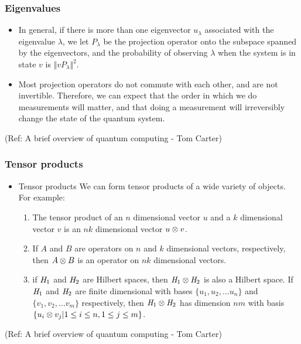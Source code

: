  \begin{frame}[fragile]\frametitle{Eigenvalues}

\begin{itemize}
	\item In general, if there is more than one eigenvector $u_\lambda$ associated with the
		eigenvalue $\lambda$, we let $P_\lambda$ be the projection operator onto the subspace
		spanned by the eigenvectors, and the probability of observing $\lambda$ when the
		system is in state $v$ is $\Vert v P_\lambda \Vert ^ 2 $.
		
	\item Most projection operators do not commute with each other, and are not invertible.
	  	Therefore, we can expect that the order in which we do measurements will matter, and that
	   	doing a measurement will irreversibly change the state of the quantum system.

\end{itemize}

\tiny{(Ref: A brief overview of quantum computing - Tom Carter)}

\end{frame}

 \begin{frame}[fragile]\frametitle{Tensor products}

\begin{itemize}
	\item Tensor products \newline
	We can form tensor products of a wide variety of objects.  For example: 
	\begin{enumerate}
		\item The tensor product of an $n$ dimensional vector $u$ and a $k$ dimensional vector $v$ is 				an $nk$ dimensional vector $u \otimes v$.
		\item If $A$ and $B$ are operators on $n$ and $k$ dimensional vectors, respectively, then $A \otimes B$ is an operator on $nk$ dimensional vectors.
		\item if $\mathit{H}_1$ and $\mathit{H}_2$ are Hilbert spaces, then $\mathit{H}_1 \otimes \mathit{H}_2$ is also a Hilbert space.  If $\mathit{H}_1$ and $\mathit{H}_2$ are finite dimensional with bases $\{u_1, u_2, \ldots u_n\}$ and $\{v_1, v_2, \ldots v_m\}$ respectively, then $\mathit{H}_1 \otimes \mathit{H}_2$ has dimension $nm$ with basis $\{u_i \otimes v_j | 1 \le i \le n, 1 \le j \le m\}$.
\end{enumerate}
\end{itemize}

\tiny{(Ref: A brief overview of quantum computing - Tom Carter)}

\end{frame}

